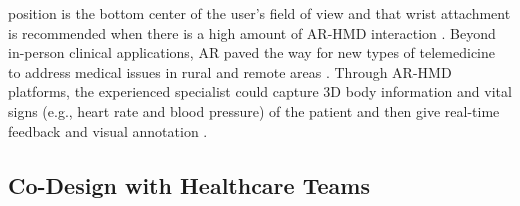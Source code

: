 position is the bottom center of the user's field of view and that wrist attachment is recommended when there is a high amount of AR-HMD interaction \cite{plabst2022push}. Beyond in-person clinical applications, AR paved the way for new types of telemedicine to address medical issues in rural and remote areas \cite{wang2021ar}. Through AR-HMD platforms, the experienced specialist could capture 3D body information and vital signs (e.g., heart rate and blood pressure) of the patient and then give real-time feedback and visual annotation \cite{anton2017augmented}.



\subsection{Co-Design with Healthcare Teams}

